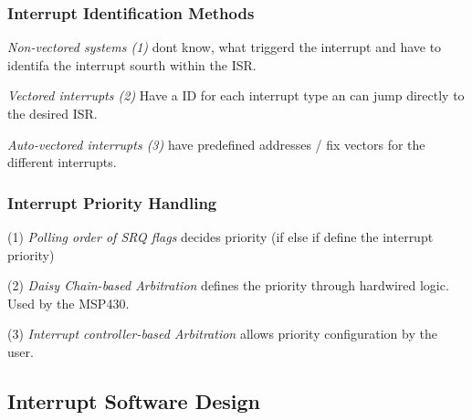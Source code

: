 \subsubsection{Interrupt Identification Methods }
\textit{Non-vectored systems (1)} dont know, what triggerd the interrupt and have to identifa the interrupt sourth within the ISR.

\textit{Vectored interrupts (2)} Have a ID for each interrupt type an can jump directly to the desired ISR.

\textit{Auto-vectored interrupts (3)} have predefined addresses / fix vectors for the different interrupts.

\subsubsection{Interrupt Priority Handling }
(1) \textit{Polling order of SRQ flags} decides priority (if else if define the interrupt priority)

(2) \textit{Daisy Chain-based Arbitration} defines the priority through hardwired logic. Used by the MSP430.

(3) \textit{Interrupt controller-based Arbitration} allows priority configuration by the user. 

\subsection{Interrupt Software Design }


